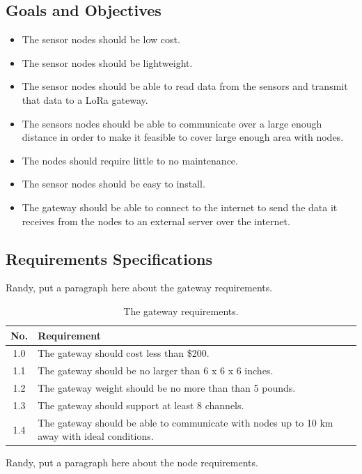 \subsection{Goals and Objectives}
\begin{itemize}
    \item The sensor nodes should be low cost. 
    \item The sensor nodes should be lightweight. 
    \item The sensor nodes should be able to read data from the sensors and transmit that data to a LoRa gateway. 
    \item The sensors nodes should be able to communicate over a large enough distance in order to make it feasible to cover large enough area with nodes.
    \item The nodes should require little to no maintenance.
    \item The sensor nodes should be easy to install.
    \item The gateway should be able to connect to the internet to send the data it receives from the nodes to an external server over the internet.
\end{itemize}


\subsection{Requirements Specifications}
Randy, put a paragraph here about the gateway requirements.

\begin{table}[H]
\centering
\caption{The gateway requirements.}
\begin{tabularx}{\linewidth}{|c|X|}
\hline
No. & Requirement \\
\hline\hline
1.0 & The gateway should cost less than \$200.\\\hline
1.1 & The gateway should be no larger than 6 x 6 x 6 inches. \\\hline
1.2 & The gateway weight should be no more than than 5 pounds. \\\hline
1.3 & The gateway should support at least 8 channels. \\\hline
1.4 & The gateway should be able to communicate with nodes up to 10 km away with ideal conditions. \\\hline
\end{tabularx}
\label{tab:gateway-requirements}
\end{table}

Randy, put a paragraph here about the node requirements.

